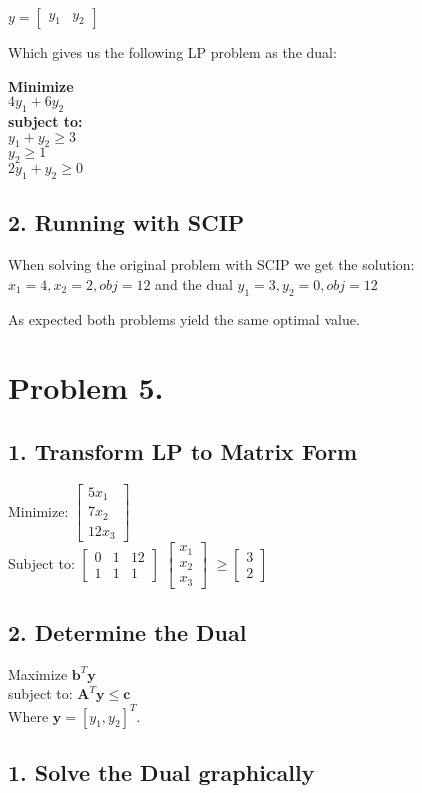 \documentclass[12pt]{report}
\begin{document}
$
y =
\begin{bmatrix}
  y_1 & y_2  
\end{bmatrix}
$ 

Which gives us the following LP problem as the dual:

\textbf{Minimize}\\
  $ 4y_1 + 6y_2 $\\
\textbf{subject to:}\\
  $ y_1 + y_2  \ge 3 $ \\
  $ y_2        \ge 1 $ \\
  $ 2y_1 + y_2 \ge 0 $ 

\subsection*{2. Running with SCIP}

When solving the original problem with SCIP we get the solution:
$ x_1 = 4, x_2 = 2, obj = 12$
and the dual
$ y_1 = 3, y_2 = 0, obj = 12$

As expected both problems yield the same optimal value.



\section*{Problem 5.}
\subsection*{1. Transform LP to Matrix Form}
Minimize:
$
\begin{bmatrix}
  5x_1 \\
  7x_2 \\
  12x_3
\end{bmatrix}
$\\
Subject to:
$
\begin{bmatrix}
  0 & 1 & 12 \\
  1 & 1 & 1 
\end{bmatrix}
$
$
\begin{bmatrix}
  x_1 \\
  x_2 \\
  x_3
\end{bmatrix}
$
$
\ge
\begin{bmatrix}
  3 \\
  2
\end{bmatrix}
$

\subsection*{2. Determine the Dual}
Maximize $ \textbf{b}^T \textbf{y}$\\
subject to: $ \textbf{A}^T \textbf{y} \le \textbf{c}$\\
Where $\textbf{y}=[y_1,y_2]^T$.


\subsection*{1. Solve the Dual graphically}
\end{document}
